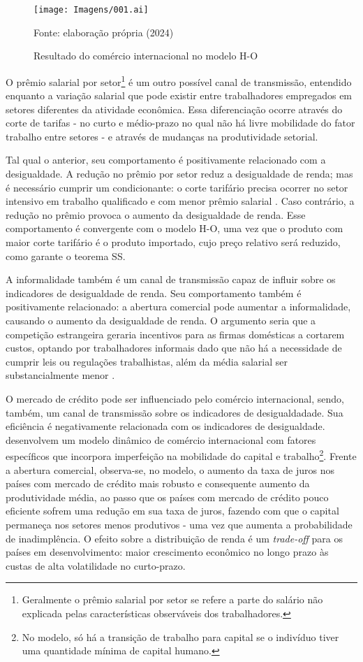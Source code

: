 \begin{figure}[h]
	\centering
	\texttt{[image: Imagens/001.ai]}
	\caption{Resultado do comércio internacional no modelo H-O}
	\label{fig:modelo_h-o}
	\footnotesize
	Fonte: elaboração própria (2024)
\end{figure}

O prêmio salarial por setor\footnote{Geralmente o prêmio salarial por setor se refere a parte do salário não explicada pelas características observáveis dos trabalhadores.} é um outro possível canal de transmissão, entendido enquanto a variação salarial que pode existir entre trabalhadores empregados em setores diferentes da atividade econômica. Essa diferenciação ocorre através do corte de tarifas - no curto e médio-prazo no qual não há livre mobilidade do fator trabalho entre setores - e através de mudanças na produtividade setorial.

Tal qual o anterior, seu comportamento é positivamente relacionado com a desigualdade. A redução no prêmio por setor reduz a desigualdade de renda; mas é necessário cumprir um condicionante: o corte tarifário precisa ocorrer no setor intensivo em trabalho qualificado e com menor prêmio salarial \cite{goldbergpavcnik04}. Caso contrário, a redução no prêmio provoca o aumento da desigualdade de renda. Esse comportamento é convergente com o modelo H-O, uma vez que o produto com maior corte tarifário é o produto importado, cujo preço relativo será reduzido, como garante o teorema SS.

A informalidade também é um canal de transmissão capaz de influir sobre os indicadores de desigualdade de renda. Seu comportamento também é positivamente relacionado: a abertura comercial pode aumentar a informalidade, causando o aumento da desigualdade de renda. O argumento seria que a competição estrangeira geraria incentivos para as firmas domésticas a cortarem custos, optando por trabalhadores informais \cite{goldbergpavcnik04} dado que não há a necessidade de cumprir leis ou regulações trabalhistas, além da média salarial ser substancialmente menor \cite{bargain14}.

O mercado de crédito pode ser influenciado pelo comércio internacional, sendo, também, um canal de transmissão sobre os indicadores de desigualdadade. Sua eficiência é negativamente relacionada com os indicadores de desigualdade. \textcite{banerjee04} desenvolvem um modelo dinâmico de comércio internacional com fatores específicos que incorpora imperfeição na mobilidade do capital e trabalho\footnote{No modelo, só há a transição de trabalho para capital se o indivíduo tiver uma quantidade mínima de capital humano.}. Frente a abertura comercial, observa-se, no modelo, o aumento da taxa de juros nos países com mercado de crédito mais robusto e consequente aumento da produtividade média, ao passo que os países com mercado de crédito pouco eficiente sofrem uma redução em sua taxa de juros, fazendo com que o capital permaneça nos setores menos produtivos - uma vez que aumenta a probabilidade de inadimplência. O efeito sobre a distribuição de renda é um \textit{trade-off} para os países em desenvolvimento: maior crescimento econômico no longo prazo às custas de alta volatilidade no curto-prazo.


